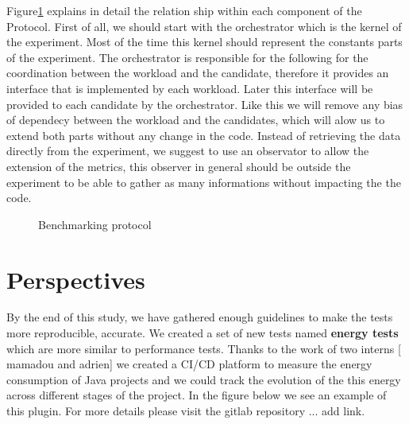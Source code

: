 Figure\ref{fig:benchmarkingprotocol} explains in detail the relation ship within each component of the Protocol. 
First of all, we should start with the orchestrator which is the kernel of the experiment. Most of the time this kernel should represent the constants parts of the experiment. 
The orchestrator is responsible for the following  for the coordination between the workload and the candidate, therefore it provides an interface that is implemented by each workload. 
Later this interface will be provided to each candidate by the orchestrator. Like this we will remove any bias of dependecy between the workload and the candidates, which will alow us to extend both parts without any change in the code. 
Instead of retrieving the data directly from the experiment, we suggest to use an observator to allow the extension of the metrics, this observer in general should be outside the experiment to be able to gather as many informations without impacting the the code.  
\begin{figure}[!htb]
    \caption{Benchmarking protocol}\label{fig:benchmarkingprotocol}
\end{figure}



\section{Perspectives}
By the end of this study, we have gathered enough guidelines to make the tests more reproducible, accurate.
We created a set of new tests named \textbf{energy tests} which are more similar to performance tests.
Thanks to the work of two interns [ mamadou and adrien] we created a CI/CD platform to measure the energy consumption of Java projects and we could track the evolution of the this energy across different stages of the project.
In the figure below we see an example of this plugin.
For more details please visit the gitlab repository ... add link.


